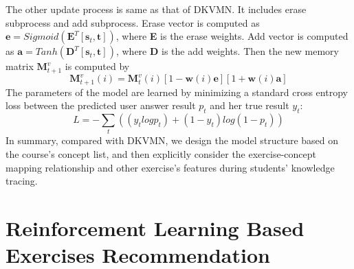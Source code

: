 \documentclass{edm_template}
\begin{document}
The other update process is same as that of DKVMN. It includes erase subprocess and add subprocess. Erase vector is computed as $\textbf{e} = Sigmoid(\textbf{E}^T[\textbf{s}_t,\textbf{t}])$, where \textbf{E} is the erase weights. Add vector is computed as $\textbf{a} = Tanh(\textbf{D}^T[\textbf{s}_t, \textbf{t}])$, where \textbf{D} is the add weights.
Then the new memory matrix $\textbf{M}_{t+1}^v$ is computed by
\begin{displaymath}
\textbf{M}_{t+1}^v(i) = \textbf{M}_t^v(i)[1-\textbf{w}(i)\textbf{e}][1+\textbf{w}(i)\textbf{a}]
\end{displaymath}
The parameters of the model are learned by minimizing a standard cross entropy loss between the predicted user answer result $p_t$ and her true result $y_t$:
\begin{displaymath}
L = -\sum\limits_{t}((y_tlogp_t) + (1 - y_t)log(1 - p_t))
\end{displaymath}
In summary, compared with DKVMN, we design the model structure based on the course's concept list, and then explicitly consider the exercise-concept mapping relationship and other exercise's features during students' knowledge tracing.


\section{Reinforcement Learning Based Exercises Recommendation}
\end{document}

